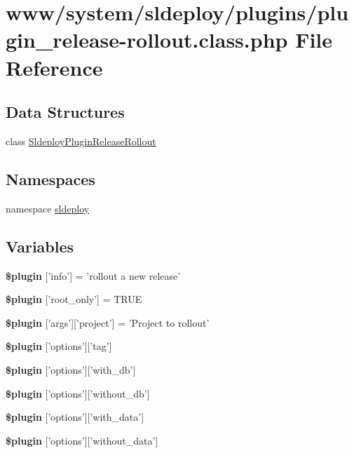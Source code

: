 \hypertarget{plugin__release-rollout_8class_8php}{
\section{www/system/sldeploy/plugins/plugin\_\-release-\/rollout.class.php File Reference}
\label{plugin__release-rollout_8class_8php}
}
\subsection*{Data Structures}
\begin{DoxyCompactItemize}
\item 
class \hyperlink{class_sldeploy_plugin_release_rollout}{SldeployPluginReleaseRollout}
\end{DoxyCompactItemize}
\subsection*{Namespaces}
\begin{DoxyCompactItemize}
\item 
namespace \hyperlink{namespacesldeploy}{sldeploy}
\end{DoxyCompactItemize}
\subsection*{Variables}
\begin{DoxyCompactItemize}
\item 
\hypertarget{plugin__release-rollout_8class_8php_a95edf69ebbeaeedb03bab3bb010f2af9}{
{\bfseries \$plugin} \mbox{[}'info'\mbox{]} = 'rollout a new release'}
\label{plugin__release-rollout_8class_8php_a95edf69ebbeaeedb03bab3bb010f2af9}

\item 
\hypertarget{plugin__release-rollout_8class_8php_a1d302084fa15e3efe6c843cbb5096985}{
{\bfseries \$plugin} \mbox{[}'root\_\-only'\mbox{]} = TRUE}
\label{plugin__release-rollout_8class_8php_a1d302084fa15e3efe6c843cbb5096985}

\item 
\hypertarget{plugin__release-rollout_8class_8php_a1e79ee412498bfe3517d2984ab4c272f}{
{\bfseries \$plugin} \mbox{[}'args'\mbox{]}\mbox{[}'project'\mbox{]} = 'Project to rollout'}
\label{plugin__release-rollout_8class_8php_a1e79ee412498bfe3517d2984ab4c272f}

\item 
{\bfseries \$plugin} \mbox{[}'options'\mbox{]}\mbox{[}'tag'\mbox{]}
\item 
{\bfseries \$plugin} \mbox{[}'options'\mbox{]}\mbox{[}'with\_\-db'\mbox{]}
\item 
{\bfseries \$plugin} \mbox{[}'options'\mbox{]}\mbox{[}'without\_\-db'\mbox{]}
\item 
{\bfseries \$plugin} \mbox{[}'options'\mbox{]}\mbox{[}'with\_\-data'\mbox{]}
\item 
{\bfseries \$plugin} \mbox{[}'options'\mbox{]}\mbox{[}'without\_\-data'\mbox{]}
\end{DoxyCompactItemize}


